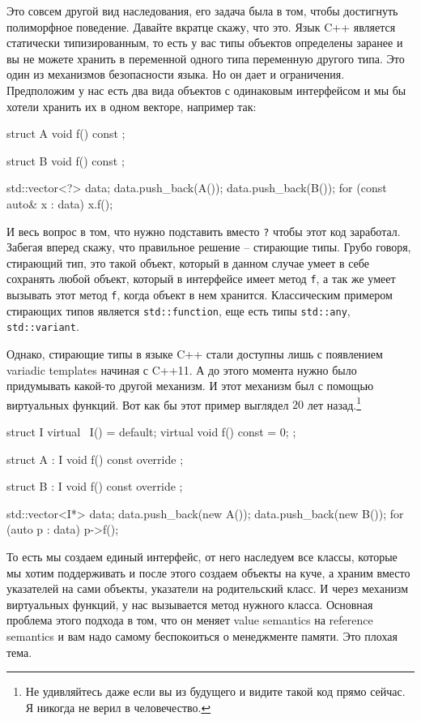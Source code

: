 \documentclass{article}
\begin{document}
Это совсем другой вид наследования, его задача была в том, чтобы достигнуть полиморфное поведение. Давайте вкратце скажу, что это. Язык C++ является статически типизированным, то есть у вас типы объектов определены заранее и вы не можете хранить в переменной одного типа переменную другого типа. Это один из механизмов безопасности языка. Но он дает и ограничения. Предположим у нас есть два вида объектов с одинаковым интерфейсом и мы бы хотели хранить их в одном векторе, например так:
\begin{cppcode}
struct A {
  void f() const {}
};

struct B {
  void f() const {}
};

std::vector<?> data;
data.push_back(A());
data.push_back(B());
for (const auto& x : data)
  x.f();
\end{cppcode}
И весь вопрос в том, что нужно подставить вместо \verb"?" чтобы этот код заработал. Забегая вперед скажу, что правильное решение -- стирающие типы. Грубо говоря, стирающий тип, это такой объект, который в данном случае умеет в себе сохранять любой объект, который в интерфейсе имеет метод \verb"f", а так же умеет вызывать этот метод \verb"f", когда объект в нем хранится. Классическим примером стирающих типов является \verb"std::function", еще есть типы \verb"std::any", \verb"std::variant".

Однако, стирающие типы в языке C++ стали доступны лишь с появлением variadic templates начиная с C++11. А до этого момента нужно было придумывать какой-то другой механизм. И этот механизм был с помощью виртуальных функций. Вот как бы этот пример выглядел $20$ лет назад.\footnote{Не удивляйтесь даже если вы из будущего и видите такой код прямо сейчас. Я никогда не верил в человечество.}
\begin{cppcode}
struct I {
  virtual ~I() = default;
  virtual void f() const = 0;
};

struct A : I {
  void f() const override {}
};

struct B : I {
  void f() const override {}
};

std::vector<I*> data;
data.push_back(new A());
data.push_back(new B());
for (auto p : data)
  p->f();
\end{cppcode}
То есть мы создаем единый интерфейс, от него наследуем все классы, которые мы хотим поддерживать и после этого создаем объекты на куче, а храним вместо указателей на сами объекты, указатели на родительский класс. И через механизм виртуальных функций, у нас вызывается метод нужного класса. Основная проблема этого подхода в том, что он меняет value semantics на reference semantics и вам надо самому беспокоиться о менеджменте памяти. Это плохая тема.
\end{document}
